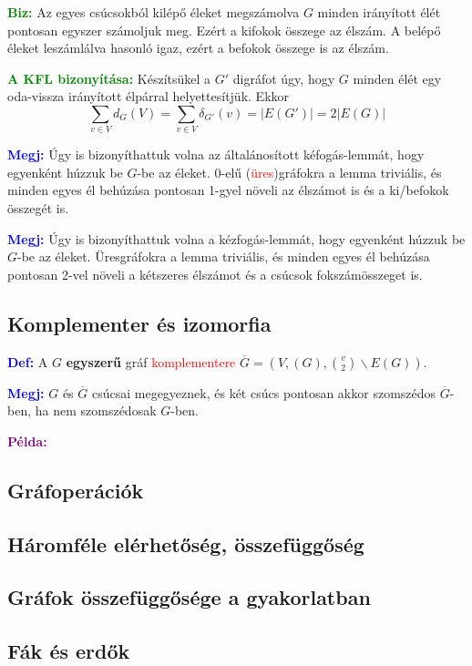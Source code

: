 \documentclass[12pt]{article}
\begin{document}
			\textcolor{green}{\textbf{Biz:}} Az egyes csúcsokból kilépő éleket megszámolva $G$ minden irányított élét pontosan egyszer számoljuk meg. Ezért a kifokok összege az élszám. A belépő éleket leszámlálva hasonló igaz, ezért a befokok összege is az élszám.
			
			\textcolor{green}{\textbf{A KFL bizonyítása:}} Készítsükel a $G'$ digráfot úgy, hogy $G$ minden élét egy oda-vissza irányított élpárral helyettesítjük. Ekkor \[\sum_{v \in V} d_G(V) = \sum_{v \in V} \delta_{G'} (v) = |E(G')| = 2|E(G)| \]

			\textcolor{blue}{\textbf{Megj:}} Úgy is bizonyíthattuk volna az általánosított kéfogás-lemmát, hogy egyenként húzzuk be $G$-be az éleket. 0-elű (\textcolor{red}{üres})gráfokra a lemma triviális, és minden egyes él behúzása pontosan 1-gyel növeli az élszámot is és a ki/befokok összegét is.

			\textcolor{blue}{\textbf{Megj:}} Úgy is bizonyíthattuk volna a kézfogás-lemmát, hogy egyenként húzzuk be $G$-be az éleket. Üresgráfokra a lemma triviális, és minden egyes él behúzása pontosan 2-vel növeli a kétszeres élszámot és a csúcsok fokszámösszeget is.


		\subsection{Komplementer és izomorfia}

			\textcolor{blue}{\textbf{Def:}}	A $G$ \textbf{egyszerű} gráf \textcolor{red}{komplementere} $\overline{G} = (V,(G), \binom{v}{2} \backslash E(G))$.

			\textcolor{blue}{\textbf{Megj:}} $G$ és $\overline{G}$ csúcsai megegyeznek, és két csúcs pontosan akkor szomszédos $\overline{G}$-ben, ha nem szomszédosak $G$-ben.

			\textcolor{purple}{\textbf{Példa:}}


		\subsection{Gráfoperációk}
		\subsection{Háromféle elérhetőség, összefüggőség}
		\subsection{Gráfok összefüggősége a gyakorlatban}
		\subsection{Fák és erdők}
\end{document}

